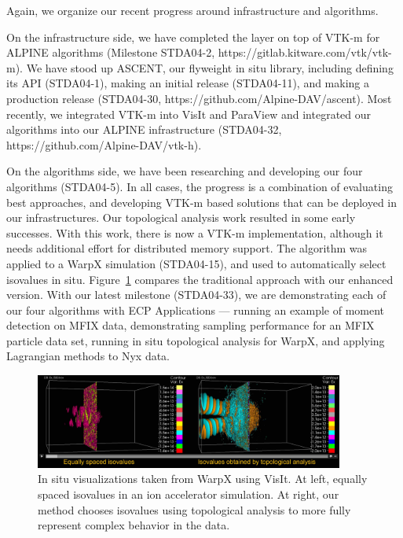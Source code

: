 Again, we organize our recent progress around infrastructure and algorithms.

On the infrastructure side, we have completed the layer on top of VTK-m for ALPINE algorithms (Milestone STDA04-2, https://gitlab.kitware.com/vtk/vtk-m). 
%
We have stood up ASCENT, our flyweight in situ library, including defining its API (STDA04-1), making an initial release (STDA04-11), and making a production release (STDA04-30, https://github.com/Alpine-DAV/ascent).
Most recently, we integrated VTK-m into VisIt and ParaView and integrated our algorithms into our ALPINE infrastructure (STDA04-32, https://github.com/Alpine-DAV/vtk-h).

On the algorithms side, we have been researching and developing our four algorithms (STDA04-5).
%
In all cases, the progress is a combination of evaluating best approaches, and developing VTK-m based solutions that
can be deployed in our infrastructures.
%
Our topological analysis work resulted in some early successes.
%
With this work, there is now a VTK-m implementation, although it needs additional effort for distributed memory support.
%
The algorithm was applied to a WarpX simulation (STDA04-15), and used to automatically select isovalues in situ.
%
Figure~\ref{fig:alpine_topology} compares the traditional approach with our enhanced version.
%
With our latest milestone (STDA04-33), we are demonstrating each of our four algorithms with ECP Applications --- running an example of moment detection on MFIX data, demonstrating sampling performance for an MFIX particle data set, running in situ topological analysis for WarpX, and applying Lagrangian methods to Nyx data.

\begin{figure}[htb]
	\centering
	\includegraphics[width=4in]{projects/2.3.4-DataViz/2.3.4.12-ALPINE/alpine_topology}
	\caption{\label{fig:alpine_topology}In situ visualizations taken from WarpX using VisIt.  At left, equally spaced isovalues in an ion accelerator simulation. At right, our method chooses isovalues using topological analysis to more fully represent complex behavior in the data.}
\end{figure}


